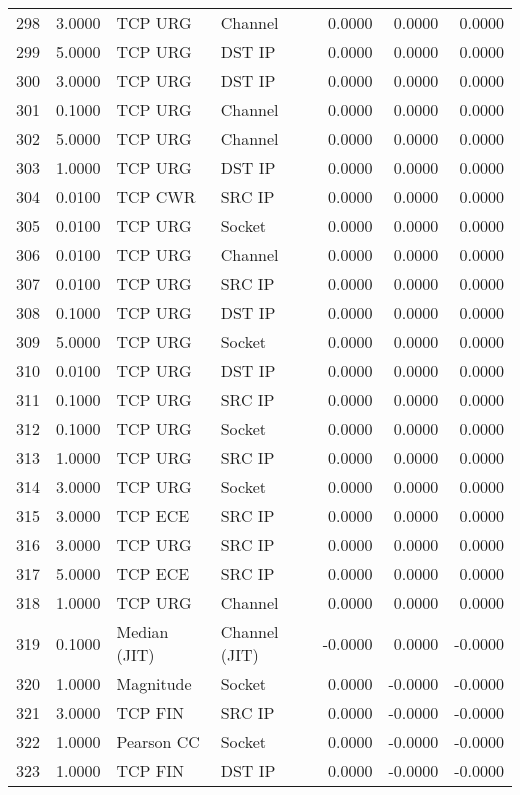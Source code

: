 \begin{longtable}{lrllrrr}
298 & 3.0000 & TCP URG & Channel & 0.0000 & 0.0000 & 0.0000 \\
299 & 5.0000 & TCP URG & DST IP & 0.0000 & 0.0000 & 0.0000 \\
300 & 3.0000 & TCP URG & DST IP & 0.0000 & 0.0000 & 0.0000 \\
301 & 0.1000 & TCP URG & Channel & 0.0000 & 0.0000 & 0.0000 \\
302 & 5.0000 & TCP URG & Channel & 0.0000 & 0.0000 & 0.0000 \\
303 & 1.0000 & TCP URG & DST IP & 0.0000 & 0.0000 & 0.0000 \\
304 & 0.0100 & TCP CWR & SRC IP & 0.0000 & 0.0000 & 0.0000 \\
305 & 0.0100 & TCP URG & Socket & 0.0000 & 0.0000 & 0.0000 \\
306 & 0.0100 & TCP URG & Channel & 0.0000 & 0.0000 & 0.0000 \\
307 & 0.0100 & TCP URG & SRC IP & 0.0000 & 0.0000 & 0.0000 \\
308 & 0.1000 & TCP URG & DST IP & 0.0000 & 0.0000 & 0.0000 \\
309 & 5.0000 & TCP URG & Socket & 0.0000 & 0.0000 & 0.0000 \\
310 & 0.0100 & TCP URG & DST IP & 0.0000 & 0.0000 & 0.0000 \\
311 & 0.1000 & TCP URG & SRC IP & 0.0000 & 0.0000 & 0.0000 \\
312 & 0.1000 & TCP URG & Socket & 0.0000 & 0.0000 & 0.0000 \\
313 & 1.0000 & TCP URG & SRC IP & 0.0000 & 0.0000 & 0.0000 \\
314 & 3.0000 & TCP URG & Socket & 0.0000 & 0.0000 & 0.0000 \\
315 & 3.0000 & TCP ECE & SRC IP & 0.0000 & 0.0000 & 0.0000 \\
316 & 3.0000 & TCP URG & SRC IP & 0.0000 & 0.0000 & 0.0000 \\
317 & 5.0000 & TCP ECE & SRC IP & 0.0000 & 0.0000 & 0.0000 \\
318 & 1.0000 & TCP URG & Channel & 0.0000 & 0.0000 & 0.0000 \\
319 & 0.1000 & Median (JIT) & Channel (JIT) & -0.0000 & 0.0000 & -0.0000 \\
320 & 1.0000 & Magnitude & Socket & 0.0000 & -0.0000 & -0.0000 \\
321 & 3.0000 & TCP FIN & SRC IP & 0.0000 & -0.0000 & -0.0000 \\
322 & 1.0000 & Pearson CC & Socket & 0.0000 & -0.0000 & -0.0000 \\
323 & 1.0000 & TCP FIN & DST IP & 0.0000 & -0.0000 & -0.0000 \\

\end{longtable}
